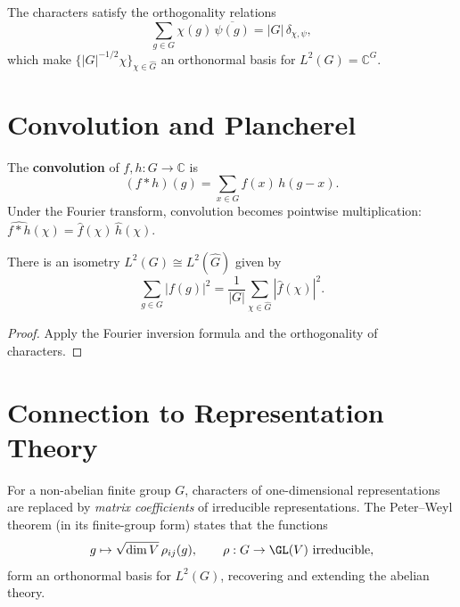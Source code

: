 The characters satisfy the orthogonality relations
\[
  \sum_{g \in G} \chi(g)\,\overline{\psi(g)} = |G|\,\delta_{\chi,\psi},
\]
which make $\{|G|^{-1/2}\chi\}_{\chi \in \hat{G}}$ an orthonormal basis for $L^2(G) = \mathbb{C}^G$.

\section{Convolution and Plancherel}

The \textbf{convolution} of $f, h : G \to \mathbb{C}$ is
\[
  (f * h)(g) = \sum_{x \in G} f(x)\,h(g - x).
\]
Under the Fourier transform, convolution becomes pointwise multiplication: $\widehat{f * h}(\chi) = \hat{f}(\chi)\,\hat{h}(\chi)$.

\begin{theorem}[Plancherel]
There is an isometry $L^2(G) \cong L^2(\hat{G})$ given by
\[
  \sum_{g \in G} |f(g)|^2 = \frac{1}{|G|} \sum_{\chi \in \hat{G}} |\hat{f}(\chi)|^2.
\]
\end{theorem}

\begin{proof}
Apply the Fourier inversion formula and the orthogonality of characters.
\end{proof}

\section{Connection to Representation Theory}

For a non-abelian finite group $G$, characters of one-dimensional representations are replaced by \emph{matrix coefficients} of irreducible representations.
The Peter--Weyl theorem (in its finite-group form) states that the functions
\[
  g \mapsto \sqrt{\dim V}\,\rho_{ij}(g), \qquad \rho : G \to \GL(V) \text{ irreducible},
\]
form an orthonormal basis for $L^2(G)$, recovering and extending the abelian theory.
